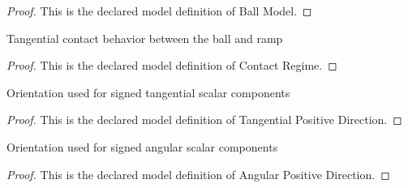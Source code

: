 \begin{proof}
  This is the declared model definition of Ball Model.
\end{proof}
\begin{definition}
  \label{def:physics:phyx-mini-0825:phyxminiproblems-problemphyxmini0825-contactregime}
  Tangential contact behavior between the ball and ramp
\end{definition}
\begin{proof}
  This is the declared model definition of Contact Regime.
\end{proof}
\begin{definition}
  \label{def:physics:phyx-mini-0825:phyxminiproblems-problemphyxmini0825-tangentialpositivedirection}
  Orientation used for signed tangential scalar components
\end{definition}
\begin{proof}
  This is the declared model definition of Tangential Positive Direction.
\end{proof}
\begin{definition}
  \label{def:physics:phyx-mini-0825:phyxminiproblems-problemphyxmini0825-angularpositivedirection}
  Orientation used for signed angular scalar components
\end{definition}
\begin{proof}
  This is the declared model definition of Angular Positive Direction.
\end{proof}
